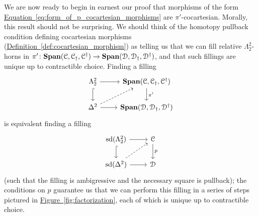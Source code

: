 \documentclass[main.tex]{subfiles}
\begin{document}
We are now ready to begin in earnest our proof that morphisms of the form \hyperref[eq:form_of_p_cocartesian_morphisms]{Equation~\ref*{eq:form_of_p_cocartesian_morphisms}} are $\pi'$-cocartesian. Morally, this result should not be surprising. We should think of the homotopy pullback condition defining cocartesian morphisms (\hyperref[def:cocartesian_morphism]{Definition~\ref*{def:cocartesian_morphism}}) as telling us that we can fill relative $\Lambda^{2}_{2}$-horns in $\pi'\colon \mathbf{Span}(\mathcal{C}, \mathcal{C}_{\dagger}, \mathcal{C}^{\dagger}) \to \mathbf{Span}(\mathcal{D}, \mathcal{D}_{\dagger}, \mathcal{D}^{\dagger})$, and that such fillings are unique up to contractible choice. Finding a filling 
\begin{equation*}
  \begin{tikzcd}
    \Lambda^{2}_{2}
    \arrow[r]
    \arrow[d, hook]
    & \SPAN\triple{C}
    \arrow[d, "\pi'"]
    \\
    \Delta^{2}
    \arrow[r]
    \arrow[ur, dashed]
    & \SPAN\triple{D}
  \end{tikzcd}
\end{equation*}
is equivalent finding a filling
\begin{equation*}
  \begin{tikzcd}
    \sd(\Lambda^{2}_{2})
    \arrow[r]
    \arrow[d, hook]
    & \category{C}
    \arrow[d, "p"]
    \\
    \sd(\Delta^{2})
    \arrow[r]
    \arrow[ur, dashed]
    & \category{D}
  \end{tikzcd}
\end{equation*}
(such that the filling is ambigressive and the necessary square is pullback); the conditions on $p$ guarantee us that we can perform this filling in a series of steps pictured in \hyperref[fig:factorization]{Figure~\ref*{fig:factorization}}, each of which is unique up to contractible choice.
\end{document}
